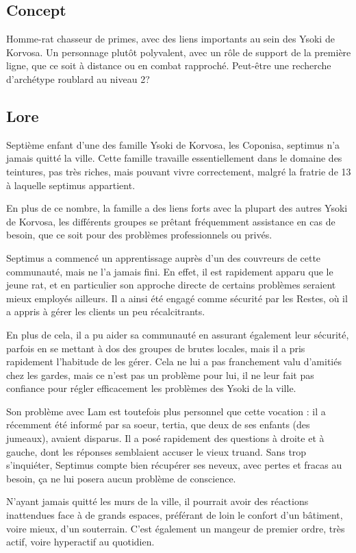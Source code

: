 \documentclass[10pt,a4paper]{book}
\begin{document}
\subsection{Concept}
Homme-rat chasseur de primes, avec des liens importants au sein des Ysoki de Korvosa. Un personnage plutôt polyvalent, avec un rôle de support de la première ligne, que ce soit à distance ou en combat rapproché. Peut-être une recherche d'archétype roublard au niveau 2?
\subsection{Lore}
Septième enfant d'une des famille Ysoki de Korvosa, les Coponisa, septimus n'a jamais quitté la ville. Cette famille travaille essentiellement dans le domaine des teintures, pas très riches, mais pouvant vivre correctement, malgré la fratrie de 13 à laquelle septimus appartient. 

En plus de ce nombre, la famille a des liens forts avec la plupart des autres Ysoki de Korvosa, les différents groupes se prêtant fréquemment assistance en cas de besoin, que ce soit pour des problèmes professionnels ou privés.

Septimus a commencé un apprentissage auprès d'un des couvreurs de cette communauté, mais ne l'a jamais fini. En effet, il est rapidement apparu que le jeune rat, et en particulier son approche directe de certains problèmes seraient mieux employés ailleurs.  Il a ainsi été engagé comme sécurité par les Restes, où il a appris à gérer les clients un peu récalcitrants.

En plus de cela, il a pu aider sa communauté en assurant également leur sécurité, parfois en se mettant à dos des groupes de brutes locales, mais il a pris rapidement l'habitude de les gérer. Cela ne lui a pas franchement valu d'amitiés chez les gardes, mais ce n'est pas un problème pour lui, il ne leur fait pas confiance pour régler efficacement les problèmes des Ysoki de la ville.

Son problème avec Lam est toutefois plus personnel que cette vocation : il a récemment été informé par sa soeur, tertia, que deux de ses enfants (des jumeaux), avaient disparus. Il a posé rapidement des questions à droite et à gauche, dont les réponses semblaient accuser le vieux truand. Sans trop s'inquiéter, Septimus compte bien récupérer ses neveux, avec pertes et fracas au besoin, ça ne lui posera aucun problème de conscience.

N'ayant jamais quitté les murs de la ville, il pourrait avoir des réactions inattendues face à de grands espaces, préférant de loin le confort d'un bâtiment, voire mieux, d'un souterrain. C'est également un mangeur de premier ordre, très actif, voire hyperactif au quotidien.
\end{document}
